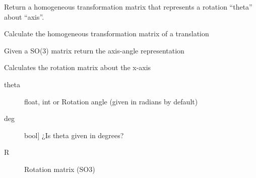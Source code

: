 \documentclass[letterpaper,10pt,english]{sphinxmanual}
\begin{document}
\begin{fulllineitems}
\label{\detokenize{_src/didactic:rkd.didactic.transformations.htmrot}}
Return a homogeneous transformation matrix that represents a 
rotation “theta” about “axis”.

\end{fulllineitems}


\begin{fulllineitems}
\label{\detokenize{_src/didactic:rkd.didactic.transformations.htmtra}}
Calculate the homogeneous transformation matrix of a translation

\end{fulllineitems}


\begin{fulllineitems}
\label{\detokenize{_src/didactic:rkd.didactic.transformations.rot2axa}}
Given a SO(3) matrix return the axis-angle representation

\end{fulllineitems}


\begin{fulllineitems}
\label{\detokenize{_src/didactic:rkd.didactic.transformations.rotx}}
Calculates the rotation matrix about the x-axis
\begin{description}
\item[{theta}] \leavevmode{[}float, int or \sphinxtitleref{symbolic}{]}
Rotation angle (given in radians by default)

\item[{deg}] \leavevmode{[}bool{]}
¿Is theta given in degrees?

\end{description}
\begin{description}
\item[{R}] \leavevmode{[}\sphinxtitleref{sympy.matrices.dense.MutableDenseMatrix}{]}
Rotation matrix (SO3)

\end{description}

\end{fulllineitems}
\end{document}
